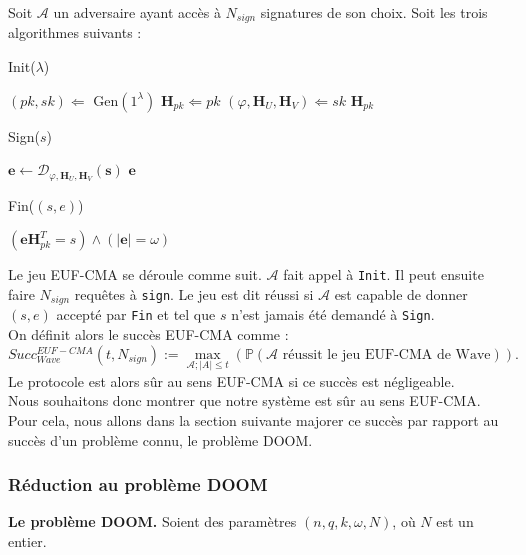 \documentclass[12pt]{article}
\theoremstyle{plain}
\theoremstyle{definition}
\newcommand{\e}{\mathbf{e}}
\newcommand{\s}{\mathbf{s}}
\begin{document}
Soit $\mathcal{A}$ un adversaire ayant accès à $N_{sign}$ signatures de son choix. Soit les trois algorithmes suivants :


\begin{algorithm} [h]
	\caption{Init($\lambda$)}
	\begin{algorithmic}[1]
    	\STATE $(pk,sk) \Longleftarrow$ Gen$(1^\lambda)$ 
    	\STATE $\mathbf{H}_{pk} \Longleftarrow pk$
    	\STATE $(\varphi,\mathbf{H}_{U},\mathbf{H}_{V})\Longleftarrow sk$
    	\RETURN $\mathbf{H}_{pk}$
    \end{algorithmic}
\end{algorithm}

\begin{algorithm}[h]
	\caption{Sign($s$)}
	\begin{algorithmic}[1]
    	\STATE $\e \leftarrow \mathcal{D}_{\varphi,\mathbf{H}_{U},\mathbf{H}_{V}}(\s)$
    	\RETURN $\e$
    \end{algorithmic}
\end{algorithm}

\begin{algorithm}[h]
	\caption{Fin($(s,e)$)}
	\begin{algorithmic}[1]
    	\RETURN $(\mathbf{e}\mathbf{H}_{pk}^T = s) \land (|\mathbf{e}| = \omega)$
    \end{algorithmic}
\end{algorithm}

\noindent Le jeu EUF-CMA se déroule comme suit. $\mathcal{A}$ fait appel à \verb|Init|. Il peut ensuite faire $N_{sign}$ requêtes à \verb|sign|. Le jeu est dit réussi si $\mathcal{A}$ est capable de donner $(s,e)$ accepté par \verb|Fin| et tel que $s$ n'est jamais été demandé à \verb|Sign|. \\
On définit alors le succès EUF-CMA comme :
$$Succ^{EUF-CMA}_{Wave}(t,N_{sign}) := \max_{\mathcal{A};|A|\leq t}(\mathbb{P}(\mathcal{A}\text{ réussit le jeu EUF-CMA de Wave})).$$
Le protocole est alors sûr au sens EUF-CMA si ce succès est négligeable. \\

\noindent Nous souhaitons donc montrer que notre système est sûr au sens EUF-CMA. Pour cela, nous allons dans la section suivante majorer ce succès par rapport au succès d'un problème connu, le problème DOOM.


\subsubsection{Réduction au problème DOOM}
\textbf{Le problème DOOM.} Soient des paramètres $(n,q,k,\omega,N)$, où $N$ est un entier. \\
\end{document}
